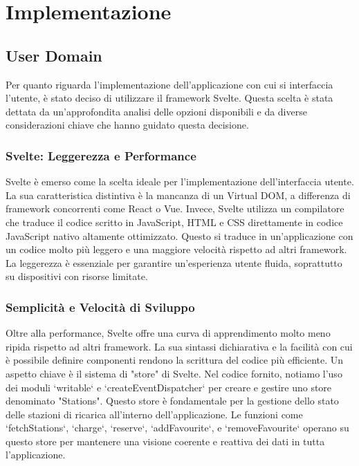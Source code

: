 

\section{Implementazione}\label{sec:implementazione}


\subsection{User Domain}

Per quanto riguarda l'implementazione dell'applicazione con cui si interfaccia l'utente, è stato deciso di utilizzare il framework Svelte. Questa scelta è stata dettata da un'approfondita analisi delle opzioni disponibili e da diverse considerazioni chiave che hanno guidato questa decisione.

\subsubsection{Svelte: Leggerezza e Performance}

Svelte è emerso come la scelta ideale per l'implementazione dell'interfaccia utente. La sua caratteristica distintiva è la mancanza di un Virtual DOM, a differenza di framework concorrenti come React o Vue. Invece, Svelte utilizza un compilatore che traduce il codice scritto in JavaScript, HTML e CSS direttamente in codice JavaScript nativo altamente ottimizzato. Questo si traduce in un'applicazione con un codice molto più leggero e una maggiore velocità rispetto ad altri framework. La leggerezza è essenziale per garantire un'esperienza utente fluida, soprattutto su dispositivi con risorse limitate.

\subsubsection{Semplicità e Velocità di Sviluppo}

Oltre alla performance, Svelte offre una curva di apprendimento molto meno ripida rispetto ad altri framework. La sua sintassi dichiarativa e la facilità con cui è possibile definire componenti rendono la scrittura del codice più efficiente. Un aspetto chiave è il sistema di "store" di Svelte. Nel codice fornito, notiamo l'uso dei moduli `writable` e `createEventDispatcher` per creare e gestire uno store denominato "Stations". Questo store è fondamentale per la gestione dello stato delle stazioni di ricarica all'interno dell'applicazione. Le funzioni come `fetchStations`, `charge`, `reserve`, `addFavourite`, e `removeFavourite` operano su questo store per mantenere una visione coerente e reattiva dei dati in tutta l'applicazione.

